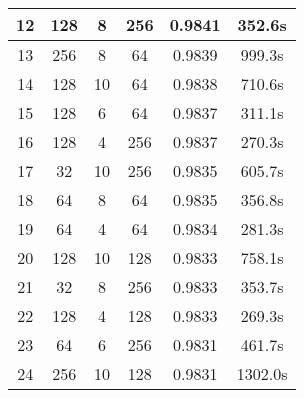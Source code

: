 \begin{table}[htbp]
\begin{center}
\begin{tabular}{|c|c|c|c|c|c|}
      \hline
      12            & 128                   & 8                       & 256                        & 0.9841                     & 352.6s                      \\
      \hline
      13            & 256                   & 8                       & 64                         & 0.9839                     & 999.3s                      \\
      \hline
      14            & 128                   & 10                      & 64                         & 0.9838                     & 710.6s                      \\
      \hline
      15            & 128                   & 6                       & 64                         & 0.9837                     & 311.1s                      \\
      \hline
      16            & 128                   & 4                       & 256                        & 0.9837                     & 270.3s                      \\
      \hline
      17            & 32                    & 10                      & 256                        & 0.9835                     & 605.7s                      \\
      \hline
      18            & 64                    & 8                       & 64                         & 0.9835                     & 356.8s                      \\
      \hline
      19            & 64                    & 4                       & 64                         & 0.9834                     & 281.3s                      \\
      \hline
      20            & 128                   & 10                      & 128                        & 0.9833                     & 758.1s                      \\
      \hline
      21            & 32                    & 8                       & 256                        & 0.9833                     & 353.7s                      \\
      \hline
      22            & 128                   & 4                       & 128                        & 0.9833                     & 269.3s                      \\
      \hline
      23            & 64                    & 6                       & 256                        & 0.9831                     & 461.7s                      \\
      \hline
      24            & 256                   & 10                      & 128                        & 0.9831                     & 1302.0s                     \\

\end{tabular}
\end{center}
\end{table}
